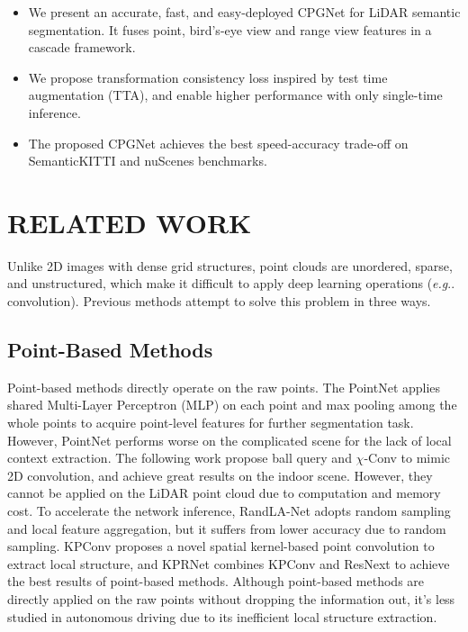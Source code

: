 \documentclass[letterpaper, 10 pt, conference]{ieeeconf}
\makeatletter
\DeclareRobustCommand\onedot{\futurelet\@let@token\@onedot}
\def\@onedot{\ifx\@let@token.\else.\null\fi\xspace}
\def\eg{\emph{e.g}\onedot} \def\Eg{\emph{E.g}\onedot}
\makeatother
\begin{document}
\begin{itemize}
\item We present an accurate, fast, and easy-deployed CPGNet
for LiDAR semantic segmentation. It fuses point, bird’s-eye view and range view features in a cascade framework.

\item We propose transformation consistency loss inspired by test time augmentation (TTA), and enable higher performance  with only single-time inference.

\item The proposed CPGNet achieves the best speed-accuracy trade-off on SemanticKITTI and nuScenes benchmarks.
\end{itemize}

\section{RELATED WORK}
Unlike 2D images with dense grid structures, point clouds are unordered, sparse, and unstructured, which make it difficult to apply deep learning operations (\eg convolution). Previous methods attempt to solve this problem in three ways.

\subsection{Point-Based Methods}
Point-based methods directly operate on the raw points. The PointNet \cite{qi2017pointnet} applies shared Multi-Layer Perceptron (MLP) on each point and max pooling among the whole points to acquire point-level features for further segmentation task. However, PointNet performs worse on the complicated scene for the lack of local context extraction. The following work \cite{qi2017pointnetplus, li2018pointcnn} propose ball query and $\chi$-Conv to mimic 2D convolution, and achieve great results on the indoor scene. However, they cannot be applied on the LiDAR point cloud due to computation and memory cost. To accelerate the network inference, RandLA-Net \cite{hu2020randla} adopts random sampling and local feature aggregation, but it suffers from lower accuracy due to random sampling. KPConv \cite{thomas2019kpconv} proposes a novel spatial kernel-based
point convolution to extract local structure, and KPRNet \cite{kochanov2020kprnet} combines KPConv and ResNext \cite{xie2017aggregated} to achieve the best results of point-based methods. Although point-based methods are directly applied on the raw points without dropping the information out, it’s less studied in autonomous driving due to its inefficient local structure extraction.
\end{document}
